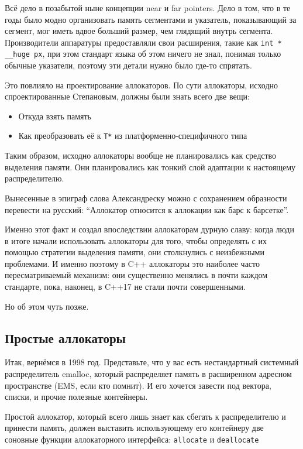 \documentclass[a4paper,12pt,oneside]{book}
\begin{document}
Всё дело в позабытой ныне концепции near и far pointers. Дело в том, что в те годы было модно организовать память сегментами и указатель, показывающий за сегмент, мог иметь вдвое больший размер, чем глядящий внутрь сегмента. Производители аппаратуры предоставляли свои расширения, такие как \lstinline!int * __huge px!, при этом стандарт языка об этом ничего не знал, понимая только обычные указатели, поэтому эти детали нужно было где-то спрятать.

Это повлияло на проектирование аллокаторов. По сути аллокаторы, исходно спроектированные Степановым, должны были знать всего две вещи:

\begin{itemize}
\item Откуда взять память
\item Как преобразовать её к \lstinline!T*! из платформенно-специфичного типа
\end{itemize} 

Таким образом, исходно аллокаторы вообще не планировались как средство выделения памяти. Они планировались как тонкий слой адаптации к настоящему распределителю.

Вынесенные в эпиграф слова Александреску можно с сохранением образности перевести на русский: ``Аллокатор относится к аллокации как барс к барсетке''.

Именно этот факт и создал впоследствии аллокаторам дурную славу: когда люди в итоге начали использовать аллокаторы для того, чтобы определять с их помощью стратегии выделения памяти, они столкнулись с неизбежными проблемами. И именно поэтому в C++ аллокаторы это наиболее часто пересматриваемый механизм: они существенно менялись в почти каждом стандарте, пока, наконец, в C++17 не стали почти совершенными.

Но об этом чуть позже.

\subsection{Простые аллокаторы}\label{sub:stateless}

Итак, вернёмся в 1998 год. Представьте, что у вас есть нестандартный системный распределитель emalloc, который распределяет память в расширенном адресном пространстве (EMS, если кто помнит). И его хочется завести под вектора, списки, и прочие полезные контейнеры.

Простой аллокатор, который всего лишь знает как сбегать к распределителю и принести память, должен выставить использующему его контейнеру две соновные функции аллокаторного интерфейса: \lstinline!allocate! и \lstinline!deallocate!
\end{document}
